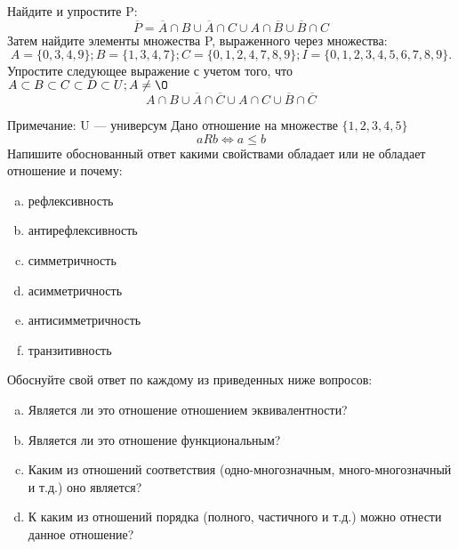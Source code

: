 \documentclass[10pt]{exam}
\begin{document}
\begin{questions}
\question
Найдите и упростите P:
\begin{equation*}
\overline{P} = \overline{A} \cap B \cup \overline{A} \cap C \cup A \cap \overline{B} \cup \overline{B} \cap C
\end{equation*}
Затем найдите элементы множества P, выраженного через множества:
\begin{equation*}
A = \{0, 3, 4, 9\}; 
B = \{1, 3, 4, 7\};
C = \{0, 1, 2, 4, 7, 8, 9\};
I = \{0, 1, 2, 3, 4, 5, 6, 7, 8, 9\}.
\end{equation*}\question
Упростите следующее выражение с учетом того, что $A\subset B \subset C \subset D \subset U; A \neq \O$
\begin{equation*}
A \cap B \cup \overline{A} \cap \overline{C} \cup A \cap C \cup \overline{B} \cap \overline{C}
\end{equation*}

Примечание: U — универсум\question
Дано отношение на множестве $\{1, 2, 3, 4, 5\}$ 
\begin{equation*}
aRb \iff a \leq b
\end{equation*}
Напишите обоснованный ответ какими свойствами обладает или не обладает отношение и почему:   
\begin{enumerate} [a)]\setcounter{enumi}{0}
\item рефлексивность
\item антирефлексивность
\item симметричность
\item асимметричность
\item антисимметричность
\item транзитивность
\end{enumerate}

Обоснуйте свой ответ по каждому из приведенных ниже вопросов:
\begin{enumerate} [a)]\setcounter{enumi}{0}
    \item Является ли это отношение отношением эквивалентности?
    \item Является ли это отношение функциональным?
    \item Каким из отношений соответствия (одно-многозначным, много-многозначный и т.д.) оно является?
    \item К каким из отношений порядка (полного, частичного и т.д.) можно отнести данное отношение?
\end{enumerate}



\end{questions}
\end{document}
